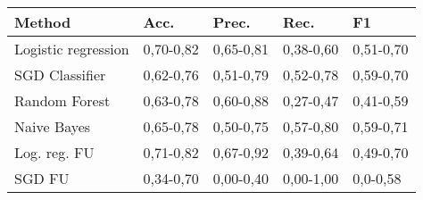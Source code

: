 \begin{tabular}{ l | l l l l }
	Method & Acc. & Prec. & Rec. & F1 \\
	\hline
	Logistic regression & 0,70-0,82 & 0,65-0,81 & 0,38-0,60 & 0,51-0,70 \\
	SGD Classifier & 0,62-0,76 & 0,51-0,79 & 0,52-0,78 & 0,59-0,70 \\
	Random Forest & 0,63-0,78 & 0,60-0,88 & 0,27-0,47 & 0,41-0,59 \\
	Naive Bayes & 0,65-0,78 & 0,50-0,75 & 0,57-0,80 & 0,59-0,71 \\
	Log. reg. FU & 0,71-0,82 & 0,67-0,92 & 0,39-0,64 & 0,49-0,70 \\
	SGD FU & 0,34-0,70 & 0,00-0,40 & 0,00-1,00 & 0,0-0,58 \\
\end{tabular}
